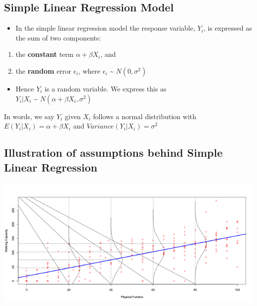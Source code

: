 \documentclass[
]{book}
\providecommand{\tightlist}{%
  \setlength{\itemsep}{0pt}\setlength{\parskip}{0pt}}
\begin{document}
\hypertarget{simple-linear-regression-model}{%
\subsection{Simple Linear Regression Model}\label{simple-linear-regression-model}}

\begin{itemize}
\tightlist
\item
  In the simple linear regression model the response variable, \(Y_i\), is expressed as the sum of two components:
\end{itemize}

\begin{enumerate}
\def\labelenumi{\arabic{enumi}.}
\tightlist
\item
  the \textbf{constant} term \(\alpha+\beta X_i\), and\\
\item
  the \textbf{random} error \(\epsilon_i\), where \(\epsilon_i\) \textasciitilde{} \(N(0,\sigma^2)\)
\end{enumerate}

\begin{itemize}
\tightlist
\item
  Hence \(Y_i\) is a random variable. We express this as\\
  \(Y_i | X_i\) \textasciitilde{} \(N(\alpha+\beta X_i,\sigma^2)\)
\end{itemize}

In words, we say \(Y_i\) given \(X_i\) follows a normal distribution with\\
\(E(Y_i | X_i ) =\alpha+\beta X_i\) and \(Variance(Y_i|X_i)=\sigma^2\)

\hypertarget{illustration-of-assumptions-behind-simple-linear-regression}{%
\subsection{Illustration of assumptions behind Simple Linear Regression}\label{illustration-of-assumptions-behind-simple-linear-regression}}

\includegraphics[width=1\linewidth]{./12_21}
\end{document}
